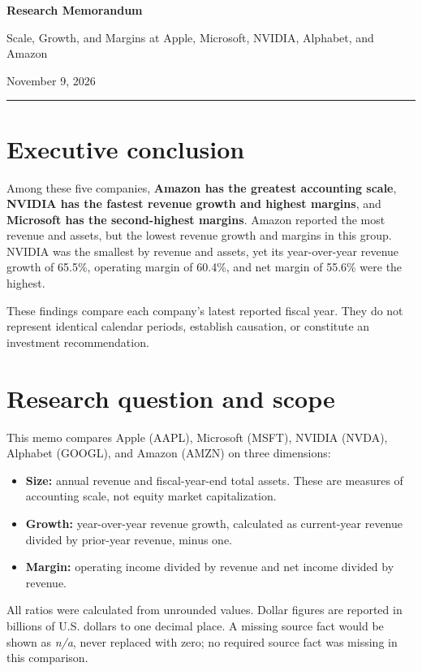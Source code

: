 \documentclass[11pt]{article}
\begin{document}
\begin{center}
    {\Large\bfseries Research Memorandum\par}
    \vspace{0.35em}
    {\large Scale, Growth, and Margins at Apple, Microsoft, NVIDIA, Alphabet, and Amazon\par}
    \vspace{0.5em}
    November 9, 2026
\end{center}
\hrule
\vspace{0.8em}

\section*{Executive conclusion}

Among these five companies, \textbf{Amazon has the greatest accounting scale}, \textbf{NVIDIA has the fastest revenue growth and highest margins}, and \textbf{Microsoft has the second-highest margins}. Amazon reported the most revenue and assets, but the lowest revenue growth and margins in this group. NVIDIA was the smallest by revenue and assets, yet its year-over-year revenue growth of 65.5\%, operating margin of 60.4\%, and net margin of 55.6\% were the highest.

These findings compare each company's latest reported fiscal year. They do not represent identical calendar periods, establish causation, or constitute an investment recommendation.

\section*{Research question and scope}

This memo compares Apple (AAPL), Microsoft (MSFT), NVIDIA (NVDA), Alphabet (GOOGL), and Amazon (AMZN) on three dimensions:

\begin{itemize}
    \item \textbf{Size:} annual revenue and fiscal-year-end total assets. These are measures of accounting scale, not equity market capitalization.
    \item \textbf{Growth:} year-over-year revenue growth, calculated as current-year revenue divided by prior-year revenue, minus one.
    \item \textbf{Margin:} operating income divided by revenue and net income divided by revenue.
\end{itemize}

All ratios were calculated from unrounded values. Dollar figures are reported in billions of U.S. dollars to one decimal place. A missing source fact would be shown as \emph{n/a}, never replaced with zero; no required source fact was missing in this comparison.
\end{document}
